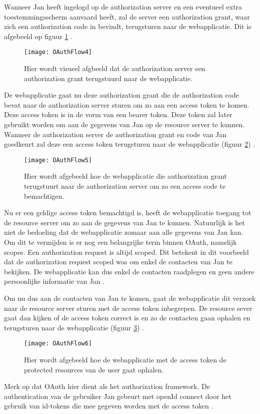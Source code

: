 Wanneer Jan heeft ingelogd op de authorization server en een eventueel extra toestemmingsscherm aanvaard heeft, zal de server een authorization grant, waar zich een authorization code in bevindt, terugsturen naar de webapplicatie. Dit is afgebeeld op figuur \ref{fig:oauth4}  \autocite{Services2016}.
\begin{figure}[H]
	\centering
	\texttt{[image: OAuthFlow4]} 
	\caption[Authorization grant wordt teruggestuurd]{Hier wordt visueel afgbeeld dat de authorization server een authorization grant terugstuurd naar de webapplicatie.}
	\label{fig:oauth4}
\end{figure}
De webapplicatie gaat nu deze authorization grant die de authorization code bevat naar de authorization server sturen om zo aan een access token te komen. Deze access token is in de vorm van een bearer token. Deze token zal later gebruikt worden om aan de gegevens van Jan op de resource server te kunnen. Wanneer de authorization server de authorization grant en code van Jan goedkeurt zal deze een access token terugsturen naar de webapplicatie (figuur \ref{fig:oauth5})  \autocite{Services2016} \autocite{OktaDev2018}.
\begin{figure}[H]
	\centering
	\texttt{[image: OAuthFlow5]} 
	\caption[Ophalen van de access code]{Hier wordt afgebeeld hoe de webapplicatie die authorization grant terugstuurt naar de authorization server om zo een access code te bemachtigen.}
	\label{fig:oauth5}
\end{figure}
Nu er een geldige access token bemachtigd is, heeft de webapplicatie toegang tot de resource server om zo aan de gegevens van Jan te kunnen. Natuurlijk is het niet de bedoeling dat de webapplicatie zomaar aan alle gegevens van Jan kan. Om dit te vermijden is er nog een belangrijke term binnen OAuth, namelijk scopes. Een authorization request is altijd scoped. Dit betekent in dit voorbeeld dat de authorization request scoped was om enkel de contacten van Jan te bekijken. De webapplicatie kan dus enkel de contacten raadplegen en geen andere persoonlijke informatie van Jan \autocite{Services2016} \autocite{OktaDev2018}. 

Om nu dus aan de contacten van Jan te komen, gaat de webapplicatie dit verzoek naar de resource server sturen met de access token inbegrepen. De resource sever gaat dan kijken of de access token correct is en zo de contacten gaan ophalen en terugsturen naar de webapplicatie (figuur \ref{fig:oauth6}) \autocite{Services2016} \autocite{OktaDev2018}.

\begin{figure}[H]
	\centering
	\texttt{[image: OAuthFlow6]} 
	\caption[Gebruik van access token voor ophalen protected resource]{Hier wordt afgebeeld hoe de webapplicatie met de access token de protected resources van de user gaat ophalen.}
	\label{fig:oauth6}
\end{figure}
Merk op dat OAuth hier dient als het authorization framework. De authentication van de gebruiker Jan gebeurt met openId connect door het gebruik van id-tokens die mee gegeven worden met de access token \autocite{OktaDev2018}.

